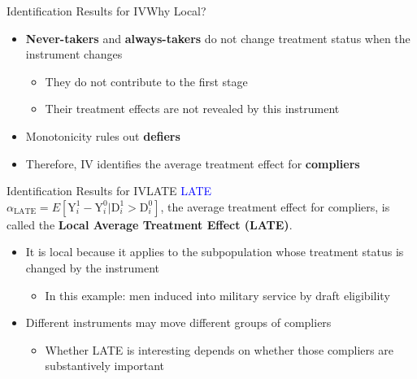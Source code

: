 \documentclass[dvipsnames,hyperref={pdfpagelabels=false}]{beamer}
\begin{document}
\begin{frame}{Identification Results for IV}{Why Local?}
	
	\begin{itemize}
		\vspace{0.2cm}
		\item \textbf{Never-takers} and \textbf{always-takers} do not change treatment status when the instrument changes
		\vspace{0.2cm}
		\begin{itemize}
			\item They do not contribute to the first stage
			\vspace{0.2cm}
			\item Their treatment effects are not revealed by this instrument
			\vspace{0.2cm}
		\end{itemize}
		\item Monotonicity rules out \textbf{defiers}
		\vspace{0.2cm}
		\item Therefore, IV identifies the average treatment effect for \textbf{compliers}
	\end{itemize}
\end{frame}








\begin{frame}{Identification Results for IV}{LATE}
	\textcolor{blue}{LATE}\\
	$\alpha_{\text{LATE}}=E[\mathrm{Y}^{1}_{i}-\mathrm{Y}^{0}_{i}|\mathrm{D}^{1}_{i}>\mathrm{D}^{0}_{i}]$, the average treatment effect for compliers, is called the \textbf{Local Average Treatment Effect (LATE)}.
	\begin{itemize}
		\vspace{0.2cm}
		\item It is local because it applies to the subpopulation whose treatment status is changed by the instrument
		\vspace{0.2cm}
			\begin{itemize}
		\item In this example: men induced into military service by draft eligibility
		\vspace{0.2cm}
			\end{itemize}
		\item Different instruments may move different groups of compliers
		\vspace{0.2cm}
					\begin{itemize}
		\item Whether LATE is interesting depends on whether those compliers are substantively important
					\end{itemize}
	\end{itemize}
\end{frame}
\end{document}
